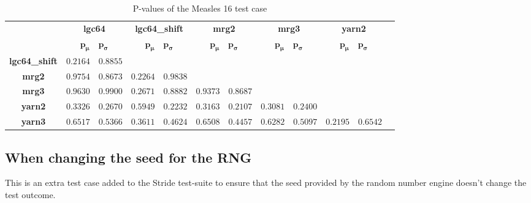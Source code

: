 \documentclass[natbib=true]{acmart}
\begin{document}
\begin{table}[!hbt]
    \begin{tabular}{c|c|c|c|c|c|c}
        & \textbf{lgc64} & \textbf{lgc64\_shift} & \textbf{mrg2} & \textbf{mrg3} & \textbf{yarn2} \\
        &  \( \bm{p_\mu} \quad \bm{p_\sigma} \)
            &  \( \bm{p_\mu} \quad \bm{p_\sigma} \)
            &  \( \bm{p_\mu} \quad \bm{p_\sigma} \)
            &  \( \bm{p_\mu} \quad \bm{p_\sigma} \)
            &  \( \bm{p_\mu} \quad \bm{p_\sigma} \) \\
        \textbf{lgc64\_shift}
            & \( 0.2164 \quad 0.8855 \)
            & \cellcolor{gray}
            & \cellcolor{gray}
            & \cellcolor{gray}
            & \cellcolor{gray} \\
        \textbf{mrg2}      
            & \( 0.9754 \quad 0.8673 \) 
            & \( 0.2264 \quad 0.9838 \) 
            & \cellcolor{gray}
            & \cellcolor{gray}
            & \cellcolor{gray} \\
        \textbf{mrg3}          
            & \( 0.9630 \quad 0.9900 \)
            & \( 0.2671 \quad 0.8882 \) 
            & \( 0.9373 \quad 0.8687 \) 
            & \cellcolor{gray}
            & \cellcolor{gray} \\
        \textbf{yarn2}        
            & \( 0.3326 \quad 0.2670 \)  
            & \( 0.5949 \quad 0.2232 \)  
            & \( 0.3163 \quad 0.2107 \) 
            & \( 0.3081 \quad 0.2400 \)  
            & \cellcolor{gray} \\
        \textbf{yarn3}          
            & \( 0.6517 \quad 0.5366 \)  
            & \( 0.3611 \quad 0.4624 \) 
            & \( 0.6508 \quad 0.4457 \)
            & \( 0.6282 \quad 0.5097 \) 
            & \( 0.2195 \quad 0.6542 \) \\
    \end{tabular}
    \caption{P-values of the Measles 16 test case}
    \label{tab:measles_16:p_values}
\end{table}

\FloatBarrier

\subsection{When changing the seed for the RNG}

This is an extra test case added to the Stride test-suite to ensure that the seed provided by the random number engine doesn't change the test outcome.
\end{document}
